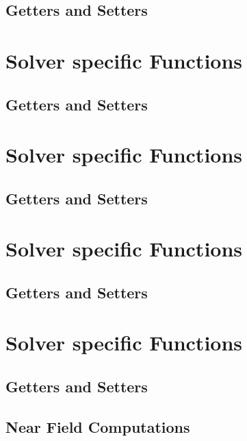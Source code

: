 \FloatBarrier
\subsection{Getters and Setters}

\FloatBarrier
\section{\pepc Solver specific Functions}


\FloatBarrier
\subsection{Getters and Setters}

\FloatBarrier
\section{\ppthreemg Solver specific Functions}


\FloatBarrier
\subsection{Getters and Setters}

\FloatBarrier
\section{\ptwonfftcap Solver specific Functions}


\FloatBarrier
\subsection{Getters and Setters}

\FloatBarrier
\section{\pthreem Solver specific Functions}

\FloatBarrier
\subsection{Getters and Setters}

\FloatBarrier
\subsection{Near Field Computations}

